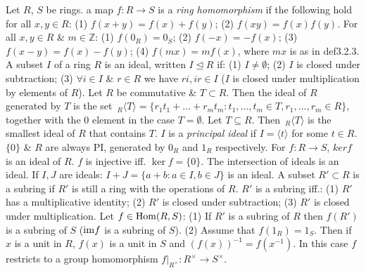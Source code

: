  Let $R$, $S$ be rings. a map $f : R \rightarrow S$ is a \emph{ring homomorphism} if the following hold for all $x, y \in R$:
(1) $f(x + y) = f(x) + f(y)$;
(2) $f(xy) = f(x)f(y)$.
 For all $x, y \in R$ \& $m \in \mathbb{Z}$:
(1) $f(0_R) = 0_S$;
(2) $f(-x) = -f(x)$;
(3) $f(x - y) = f(x) - f(y)$;
(4) $f(mx) = mf(x)$, where $mx$ is as in def3.2.3.
 A subset $I$ of a ring $R$ is an ideal, written $I \trianglelefteq R$ if:
(1) $I \ne \emptyset$;
(2) $I$ is closed under subtraction;
(3) $\forall i \in I$ \& $r \in R$ we have $ri, ir \in I$ ($I$ is closed under multiplication by elements of $R$).
 Let $R$ be commutative \& $T \subset R$. Then the ideal of $R$ generated by $T$ is the set $\,_R\langle T \rangle = \{r_1t_1 + \dots + r_mt_m : t_1, \dots, t_m \in T, r_1, \dots, r_m \in R\}$, together with the 0 element in the case $T = \emptyset$.
 Let $T \subseteq R$. Then $\,_R\langle T \rangle$ is the smallest ideal of $R$ that contains $T$. 
 $I$ is a \emph{principal ideal} if $I = \langle t \rangle$ for some $t \in R$. $\{0\}$ \& $R$ are always PI, generated by $0_R$ and $1_R$ respectively.
 For $f : R \to S$, $ker f$ is an ideal of $R$.
 $f$ is injective iff. $\ker f = \{0\}$.
 The intersection of ideals is an ideal.
 If $I, J$ are ideals: $I + J = \{a + b : a \in I, b \in J\}$ is an ideal.
 A subset $R' \subset R$ is a subring if $R'$ is still a ring with the operations of $R$.
 $R'$ is a subring iff.:
(1) $R'$ has a multiplicative identity;
(2) $R'$ is closed under subtraction;
(3) $R'$ is closed under multiplication.
 Let $f \in \text{Hom}(R, S)$:
(1) If $R'$ is a subring of $R$ then $f(R')$ is a subring of $S$ ($\text{im} f$ is a subring of $S$).
(2) Assume that $f(1_R) = 1_S$. Then if $x$ is a unit in $R$, $f(x)$ is a unit in $S$ and $(f(x))^{-1} = f(x^{-1})$. In this case $f$ restricts to a group homomorphism $f|_{R^\times} : R^{\times} \to S^{\times}$.
